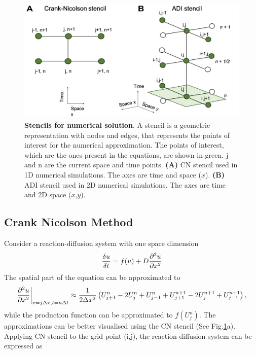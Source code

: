 \begin{figure}[H]

    \includegraphics[width=1\textwidth]{chapters/Methods/stencils}
    \caption{\textbf{Stencils for numerical solution}.  A stencil is a geometric representation with nodes and edges, that represents the points of interest for the numerical approximation. The points of interest, which are the ones present in the equations, are shown in green. j and n are the current space and time points. \textbf{(A)} \acrlong{CN} stencil used in 1D numerical simulations. The axes are time and space ($x$). \textbf{(B)} \acrshort{ADI} stencil used in 2D numerical simulations. The axes are time and 2D space ($x$,$y$).}
    \label{fig:stencils}
\end{figure}


\subsection{Crank Nicolson Method}\label{cranknicolson}
Consider a reaction-diffusion system with one space dimension
\begin{equation}
    \frac{\delta u}{\delta t} =  f(u) + D\frac{\partial^{2} {u}}{\partial {x}^{2}}
\end{equation}
The spatial part of the equation can be approximated to
\begin{equation}
    \frac{\partial^{2} {u}}{\partial {x}^{2}} \biggr\rvert_{x=j\Delta x,t=n\Delta t} \approx \frac{1}{2\Delta x^{2}}\left( U^{n}_{j+1} -  2U^{n}_{j} + U^{n}_{j-1} + U^{n+1}_{j+1} - 2U^{n+1}_{j} + U^{n+1}_{j-1}\right),
\end{equation}
while the production function can be approximated to $f ( U^{n}_{j})$.  The approximations can be better visualised using the \acrshort{CN} stencil (See Fig.\ref{fig:stencils}a).
Applying \acrshort{CN} stencil to the grid point (i,j), the reaction-diffusion system can be expressed as

